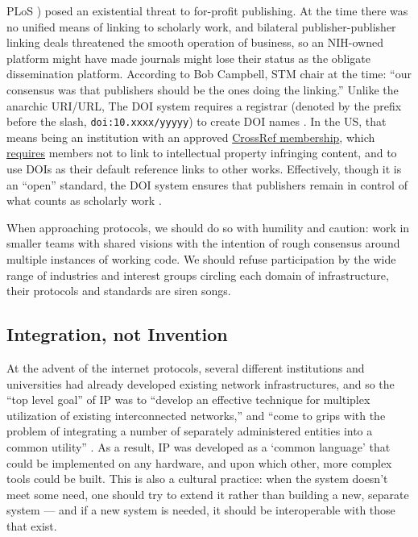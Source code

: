 PLoS \citep{varmusArtPoliticsScience2009, robertsBuildingGenBankPublished2001} ) posed an existential threat to
for-profit publishing. At the time there was no unified means of linking
to scholarly work,
and bilateral publisher-publisher linking deals threatened the smooth
operation of business, so an NIH-owned platform might have made journals
might lose their status as the obligate dissemination platform.
According to Bob Campbell, STM chair at the time: ``our consensus was
that publishers should be the ones doing the linking.'' Unlike the
anarchic URI/URL, The DOI system requires a registrar (denoted by the
prefix before the slash, \texttt{doi:10.xxxx/yyyyy}) to create DOI names
\citep{isoISO2632420122012} . In the US, that means being an
institution with an approved
\href{https://www.crossref.org/services/content-registration/}{CrossRef
membership}, which
\href{https://www.crossref.org/membership/terms/}{requires} members not
to link to intellectual property infringing content, and to use DOIs as
their default reference links to other works. Effectively, though it is
an ``open''
standard, the DOI system ensures that publishers remain in control of
what counts as scholarly work \citep{crossrefFormationCrossRefShort2009} .

When approaching protocols, we should do so with humility and caution:
work in smaller teams with shared visions with the intention of rough
consensus around multiple instances of working code. We should refuse
participation by the wide range of industries and interest groups
circling each domain of infrastructure, their protocols and standards
are siren songs.

\hypertarget{integration-not-invention}{%
\subsection{Integration, not
Invention}\label{integration-not-invention}}

At the advent of the internet protocols, several different institutions
and universities had already developed existing network infrastructures,
and so the ``top level goal'' of IP was to ``develop an effective
technique for multiplex utilization of existing interconnected
networks,'' and ``come to grips with the problem of integrating a number
of separately administered entities into a common utility'' \citep{clarkDesignPhilosophyDARPA1988} . As a result, IP was developed as a
`common language' that could be implemented on any hardware, and upon
which other, more complex tools could be built. This is also a cultural
practice: when the system doesn't meet some need, one should try to
extend it rather than building a new, separate system --- and if a new
system is needed, it should be interoperable with those that exist.


